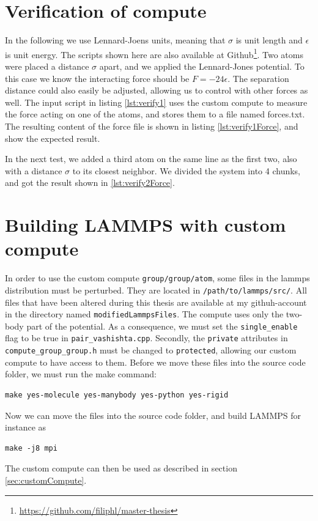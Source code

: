 \documentclass[twoside,english]{uiofysmaster}
\begin{document}
\section{Verification of compute} \label{sec:testingOfCompute}
In the following we use Lennard-Joens units, meaning that $\sigma$ is unit length and $\epsilon$ is unit energy.
The scripts shown here are also available at Github\footnote{\href{https://github.com/filiphl/master-thesis}{\url{https://github.com/filiphl/master-thesis}}}.
Two atoms were placed a distance $\sigma$ apart, and we applied the Lennard-Jones potential. 
To this case we know the interacting force should be $F=-24\epsilon$.
The separation distance could also easily be adjusted, allowing us to control with other forces as well.
The input script in listing \ref{lst:verify1} uses the custom compute to measure the force acting on one of the atoms, and stores them to a file named forces.txt.
The resulting content of the force file is shown in listing \ref{lst:verify1Force}, and show the expected result. 



In the next test, we added a third atom on the same line as the first two, also with a distance $\sigma$ to its closest neighbor.
We divided the system into 4 chunks, and got the result shown in \ref{lst:verify2Force}.

\newpage
\section{Building LAMMPS with custom compute}
In order to use the custom compute \texttt{group/group/atom}, some files in the lammps distribution must be perturbed.
They are located in \texttt{/path/to/lammps/src/}.  
All files that have been altered during this thesis are available at my githuh-account in the directory named \texttt{modifiedLammpsFiles}.  
The compute uses only the two-body part of the potential. 
As a consequence, we must set the \texttt{single\_enable} flag to be true in \texttt{pair\_vashishta.cpp}. 
Secondly, the \texttt{private} attributes in \texttt{compute\_group\_group.h} must be changed to \texttt{protected}, allowing our custom compute to have access to them.
Before we move these files into  the source code folder, we must run the make command:
\begin{lstlisting}
make yes-molecule yes-manybody yes-python yes-rigid 
\end{lstlisting}
Now we can move the files into the source code folder, and build LAMMPS for instance as
\begin{lstlisting}
make -j8 mpi
\end{lstlisting}
The custom compute can then be used as described in section \ref{sec:customCompute}.
\end{document}
